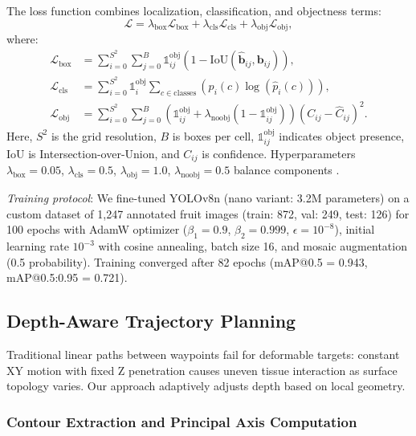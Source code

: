 \documentclass[journal]{IEEEtran}
\begin{document}
The loss function combines localization, classification, and objectness terms:
\begin{equation}
\mathcal{L} = \lambda_{\text{box}} \mathcal{L}_{\text{box}} + \lambda_{\text{cls}} \mathcal{L}_{\text{cls}} + \lambda_{\text{obj}} \mathcal{L}_{\text{obj}},
\label{eq:yolo_loss}
\end{equation}
where:
\begin{align}
\mathcal{L}_{\text{box}} &= \sum_{i=0}^{S^2} \sum_{j=0}^{B} \mathbb{1}_{ij}^{\text{obj}} \left( 1 - \text{IoU}(\hat{\boldsymbol{b}}_{ij}, \boldsymbol{b}_{ij}) \right), \label{eq:box_loss} \\
\mathcal{L}_{\text{cls}} &= \sum_{i=0}^{S^2} \mathbb{1}_{i}^{\text{obj}} \sum_{c \in \text{classes}} \left( p_i(c) \log(\hat{p}_i(c)) \right), \label{eq:cls_loss} \\
\mathcal{L}_{\text{obj}} &= \sum_{i=0}^{S^2} \sum_{j=0}^{B} \left( \mathbb{1}_{ij}^{\text{obj}} + \lambda_{\text{noobj}} (1 - \mathbb{1}_{ij}^{\text{obj}}) \right) (C_{ij} - \hat{C}_{ij})^2. \label{eq:obj_loss}
\end{align}
Here, $S^2$ is the grid resolution, $B$ is boxes per cell, $\mathbb{1}_{ij}^{\text{obj}}$ indicates object presence, IoU is Intersection-over-Union, and $C_{ij}$ is confidence. Hyperparameters $\lambda_{\text{box}} = 0.05$, $\lambda_{\text{cls}} = 0.5$, $\lambda_{\text{obj}} = 1.0$, $\lambda_{\text{noobj}} = 0.5$ balance components \cite{ultralytics2023yolov8}.

\textit{Training protocol}: We fine-tuned YOLOv8n (nano variant: 3.2M parameters) on a custom dataset of 1,247 annotated fruit images (train: 872, val: 249, test: 126) for 100 epochs with AdamW optimizer ($\beta_1=0.9$, $\beta_2=0.999$, $\epsilon=10^{-8}$), initial learning rate $10^{-3}$ with cosine annealing, batch size 16, and mosaic augmentation (0.5 probability). Training converged after 82 epochs (mAP@0.5 = 0.943, mAP@0.5:0.95 = 0.721).

\subsection{Depth-Aware Trajectory Planning}

Traditional linear paths between waypoints fail for deformable targets: constant XY motion with fixed Z penetration causes uneven tissue interaction as surface topology varies. Our approach adaptively adjusts depth based on local geometry.

\subsubsection{Contour Extraction and Principal Axis Computation}
\end{document}
